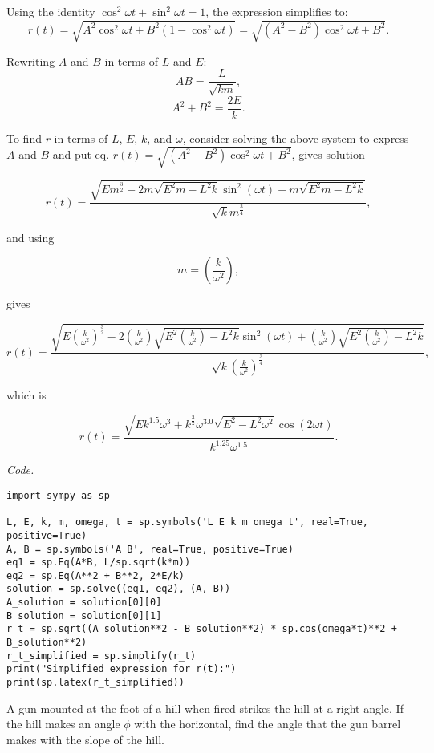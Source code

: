 \begin{solution}{6.39}
Using the identity \( \cos^2 \omega t + \sin^2 \omega t = 1 \), the expression simplifies to:
\[
r(t) = \sqrt{A^2 \cos^2 \omega t + B^2 (1 - \cos^2 \omega t)} = \sqrt{(A^2 - B^2) \cos^2 \omega t + B^2}.
\]


Rewriting \( A \) and \( B \) in terms of \( L \) and \( E \):
\[
A B = \frac{L}{\sqrt{k m}},
\]
\[
A^2 + B^2 = \frac{2E}{k}.
\]

To find \( r \) in terms of \( L \), \( E \), \( k \), and \( \omega \), consider solving the above system to express \( A \) and \( B \) and put eq. \(r(t)= \sqrt{(A^2 - B^2) \cos^2 \omega t + B^2}\), gives solution

\[r(t)=\frac{\sqrt{E m^{\frac{3}{2}} - 2 m \sqrt{E^{2} m - L^{2} k} \sin^{2}{\left(\omega t \right)} + m \sqrt{E^{2} m - L^{2} k}}}{\sqrt{k} m^{\frac{3}{4}}},\]

and using

\[m=\left(\frac{k}{{\omega}^2}\right),\]

gives

\[r(t)=\frac{\sqrt{E \left(\frac{k}{{\omega}^2}\right)^{\frac{3}{2}} - 2 \left(\frac{k}{{\omega}^2}\right) \sqrt{E^{2} \left(\frac{k}{{\omega}^2}\right) - L^{2} k} \sin^{2}{\left(\omega t \right)} + \left(\frac{k}{{\omega}^2}\right) \sqrt{E^{2} \left(\frac{k}{{\omega}^2}\right) - L^{2} k}}}{\sqrt{k} \left(\frac{k}{{\omega}^2}\right)^{\frac{3}{4}}},\]

which is

\[r(t)=\frac{\sqrt{E k^{1.5} \omega^{3} + k^{\frac{3}{2}} \omega^{3.0} \sqrt{E^{2} - L^{2} \omega^{2}} \cos{\left(2 \omega t \right)}}}{k^{1.25} \omega^{1.5}}.\]

\textit{Code.}

\begin{lstlisting}[language=iPython]
import sympy as sp

L, E, k, m, omega, t = sp.symbols('L E k m omega t', real=True, positive=True)
A, B = sp.symbols('A B', real=True, positive=True)
eq1 = sp.Eq(A*B, L/sp.sqrt(k*m))
eq2 = sp.Eq(A**2 + B**2, 2*E/k)
solution = sp.solve((eq1, eq2), (A, B))
A_solution = solution[0][0]
B_solution = solution[0][1]
r_t = sp.sqrt((A_solution**2 - B_solution**2) * sp.cos(omega*t)**2 + B_solution**2)
r_t_simplified = sp.simplify(r_t)
print("Simplified expression for r(t):")
print(sp.latex(r_t_simplified))
\end{lstlisting}
\end{solution}

\begin{problem}{6.54}
A gun mounted at the foot of a hill when fired strikes the hill at a right angle. If the hill makes an angle \(\phi\) with the horizontal, find the angle that the gun barrel makes with the slope of the hill.
\end{problem}

